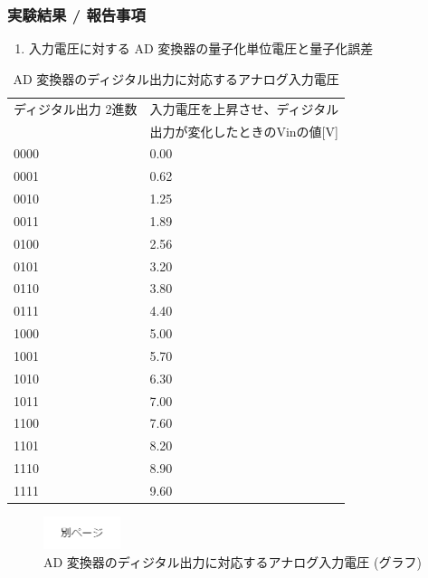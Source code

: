 \documentclass[10pt]{article}
\begin{document}
\subsubsection{実験結果 / 報告事項}
\begin{enumerate}
    \item 入力電圧に対する AD 変換器の量子化単位電圧と量子化誤差
\end{enumerate}

\begingroup
\setlength{\tabcolsep}{5pt} %
\renewcommand{\arraystretch}{1.5} %
\begin{table}[H]
    \centering
	\caption{AD 変換器のディジタル出力に対応するアナログ入力電圧}
	\begin{tabular}{|l|l|}
		\hline
		ディジタル出力 2進数  & 入力電圧を上昇させ、ディジタル \\  [0.5ex] 
		  &   出力が変化したときのVinの値[V] \\ [0.5ex] 
		\hline\hline
		0000 & 0.00 \\ \hline
        0001 & 0.62 \\ \hline
        0010 & 1.25 \\ \hline
        0011 & 1.89 \\ \hline
        0100 & 2.56 \\ \hline
        0101 & 3.20 \\ \hline
        0110 & 3.80 \\ \hline
        0111 & 4.40 \\ \hline
        1000 & 5.00 \\ \hline
        1001 & 5.70 \\ \hline
        1010 & 6.30 \\ \hline
        1011 & 7.00 \\ \hline
        1100 & 7.60 \\ \hline
        1101 & 8.20 \\ \hline
        1110 & 8.90 \\ \hline
        1111 & 9.60 \\ \hline
	\end{tabular}
\end{table} 
\endgroup

\begin{figure}[H]
		\centering
		\includegraphics[width=0.2\textwidth]{page.png}
		\caption{AD 変換器のディジタル出力に対応するアナログ入力電圧 (グラフ)}
\end{figure}
\pagebreak
\end{document}
